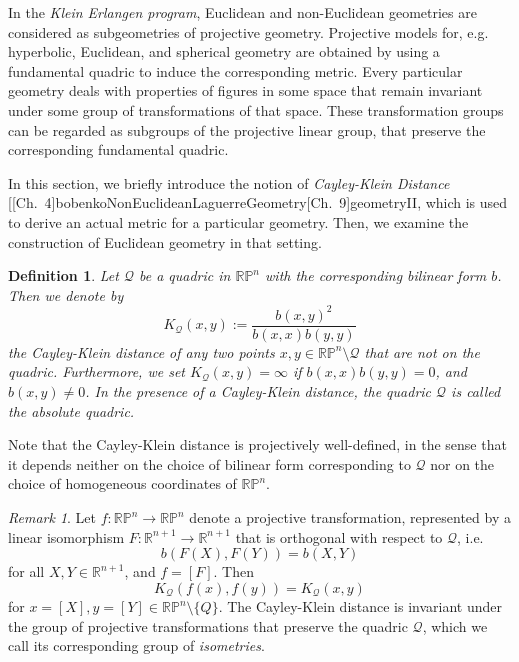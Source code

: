 \documentclass[10pt, a4paper]{article}
\makeatletter
\theoremstyle{BoldTopSpacing}
\theoremstyle{BoldTopSpacing}
\theoremstyle{BoldTopSpacing}
\theoremstyle{BoldTopBottomSpacing}
\newtheorem{definition}{Definition}[section]
\theoremstyle{BoldTopSpacing}
\theoremstyle{BoldTopBottomSpacing}
\theoremstyle{remark}
\newtheorem{remark}{\textit{Remark}}[section]
\newcommand{\citecomment}[2][]{\citen{#2}#1\citevar}
\newcommand{\citeone}[1]{\citecomment{#1}}
\newcommand{\citetwo}[2][]{\citecomment[,~#1]{#2}}
\newcommand{\citevar}{\@ifnextchar\bgroup{;~\citeone}{\@ifnextchar[{;~\citetwo}{]}}}
\newcommand{\citefirst}{\@ifnextchar\bgroup{\citeone}{\@ifnextchar[{\citetwo}{]}}}
\newcommand{\cites}{[\citefirst}
\makeatother
\begin{document}
In the \textit{Klein Erlangen program}, Euclidean and non-Euclidean geometries are considered as subgeometries of projective geometry. Projective models for, e.g. hyperbolic, Euclidean, and spherical geometry are obtained by using a fundamental quadric to induce the corresponding metric. Every particular geometry deals with properties of figures in some space that remain invariant under some group of transformations of that space. These transformation groups can be regarded as subgroups of the projective linear group, that preserve the corresponding fundamental quadric. \par
In this section, we briefly introduce the notion of \textit{Cayley-Klein Distance} \cites[\textcolor{CitationColor}{Ch.~4}]{bobenkoNonEuclideanLaguerreGeometry}[\textcolor{CitationColor}{Ch.~9}]{geometryII}, \newline
which is used to derive an actual metric for a particular geometry. Then, we examine the construction of Euclidean geometry in that setting. \par

\begin{definition}
\label{def:cayley-klein-distance}
Let $\mathcal{Q}$ be a quadric in $\mathbb{R}\mathbb{P}^n$ with the corresponding bilinear form $b$. Then we denote by
\[
    K_{\mathcal{Q}}(x, y) := \frac{b(x, y)^2}{b(x, x) b(y, y)}
\]
the \textit{Cayley-Klein distance} of any two points $x, y \in \mathbb{R}\mathbb{P}^n \setminus \mathcal{Q}$ that are not on the quadric. Furthermore, we set $K_{\mathcal{Q}}(x, y) = \infty$ if $b(x, x) b(y, y) = 0$, and $b(x, y) \neq 0$. In the presence of a Cayley-Klein distance, the quadric $\mathcal{Q}$ is called the \textit{absolute quadric}.
\end{definition}

Note that the Cayley-Klein distance is projectively well-defined, in the sense that it depends neither on the choice of bilinear form corresponding to $\mathcal{Q}$ nor on the choice of homogeneous coordinates of $\mathbb{R}\mathbb{P}^n$. \par

\begin{remark}
\label{rm:isometries-cayley-klein}
\sloppy Let $f : \mathbb{R}\mathbb{P}^n \to \mathbb{R}\mathbb{P}^n$ denote a projective transformation, represented by a linear isomorphism ${ F : \mathbb{R}^{n+1} \to \mathbb{R}^{n+1} }$ that is orthogonal with respect to $\mathcal{Q}$, i.e.
\[
    b(F(X), F(Y)) = b(X, Y)
\]
for all $X, Y \in \mathbb{R}^{n + 1}$, and $f = [F]$. Then
\[
    K_{\mathcal{Q}}(f(x), f(y)) = K_{\mathcal{Q}}(x, y)
\]
for $x = [X], y = [Y] \in \mathbb{R}\mathbb{P}^n \setminus \{ Q \}$. The Cayley-Klein distance is invariant under the group of projective transformations that preserve the quadric $\mathcal{Q}$, which we call its corresponding group of \textit{isometries}. \par
\end{remark}
\end{document}
